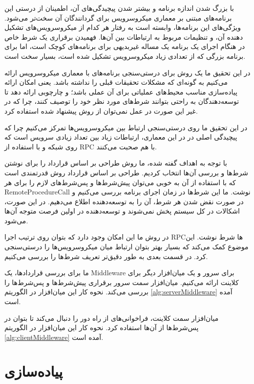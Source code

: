 با بزرگ شدن اندازه برنامه و بیشتر شدن پیچیدگی‌های آن، اطمینان از درستی این برنامه‌های مبتنی بر معماری میکروسرویس برای گردانندگان آن سخت‌تر می‌شود. ویژگی‌های این برنامه‌ها، وابسته است به رفتار هر کدام از میکروسرویس‌های تشکیل دهنده آن، و تنظیمات مربوط به ارتباطات بین آن‌ها. فهمیدن برقراری یک شرط خاص در هنگام اجرای یک برنامه یک مساله غیربدیهی برای برنامه‌های کوچک است، اما برای برنامه بزرگی که از تعدادی زیاد میکروسرویس تشکیل شده است، بسیار سخت است.

در این تحقیق ما یک روش برای درستی‌سنجی برنامه‌های با معماری میکروسرویس ارائه می‌کنیم به گونه‌ای که مشکلات تحقیقات قبلی را نداشته باشد. یعنی امکان ارائه پیاده‌سازی مناسب محیط‌های عملیاتی برای آن عملی باشد؛ و چارچوبی ارائه دهد تا توسعه‌دهندگان به راحتی بتوانند شرط‌های مورد نظر خود را توصیف کنند، چرا که در غیر این صورت در عمل نمی‌توان از روش پیشنهاد شده استفاده کرد.

در این تحقیق ما روی درستی‌سنجی ارتباط بین میکروسرویس‌ها تمرکز می‌کنیم چرا که پیچیدگی اصلی در در این معماری، ارتباطات زیاد بین تعداد زیادی سرویس است که روی شبکه و با استفاده از
\gls{RPC}
با هم صحبت می‌کنند.

با توجه به اهداف گفته شده، ما روش طراحی بر اساس قرارداد را برای نوشتن شرط‌ها و بررسی آن‌ها انتخاب کردیم. طراحی بر اساس قرارداد روش قدرتمندی است که با استفاده از آن به خوبی می‌توان پیش‌شرط‌ها و پس‌شرط‌های لازم را برای هر
\gls{RemoteProcedureCall}
نوشت. ما این شرط‌ها در زمان اجرای برنامه بررسی می‌کنیم و در صورت نقض شدن هر شرط، آن را به توسعه‌دهنده اطلاع می‌دهیم. در این صورت، اشکالات در کل سیستم پخش نمی‌شوند و توسعه‌دهنده در اولین فرصت متوجه آن‌ها می‌شود.

در روش ما این امکان وجود دارد که بتوان روی ترتیب اجرا
\gls{RPC}ها
شرط نوشت. این موضوع کمک می‌کند که بسیار بهتر بتوان ارتباط میان میکروسرویس‌ها را درستی‌سنجی کرد. در قسمت بعدی به طور دقیق‌تر تعریف شرط‌ها را بررسی می‌کنیم. 

ما برای بررسی قراردادها، یک
\gls{Middleware}
برای سرور و یک میان‌افزار دیگر برای کلاینت ارائه می‌کنیم. میان‌افزار سمت سرور برقراری پیش‌شرط‌ها و پس‌شرط‌ها را بررسی می‌کند. نحوه کار این میان‌افزار در الگوریتم
\ref{alg:serverMiddleware}
آمده است.

میان‌افزار سمت کلاینت، فراخوانی‌های از راه‌ دور را دنبال می‌کند تا بتوان در پس‌شرط‌ها از آن‌ها استفاده کرد. نحوه کار این میان‌افزار در الگوریتم
\ref{alg:clientMiddleware}
آمده است.


\section{پیاده‌سازی}

